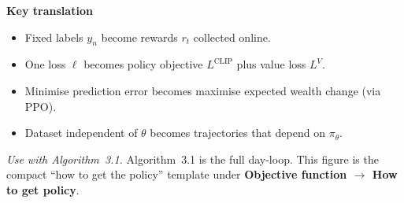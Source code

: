 \documentclass[10pt,a4paper]{article}
\begin{document}
\vspace{0.7em}
\noindent\textbf{Key translation}
\begin{itemize}\setlength\itemsep{0.12em}
  \item Fixed labels \(y_n\) become rewards \(r_t\) collected online.
  \item One loss \(\ell\) becomes policy objective \(L^{\mathrm{CLIP}}\) plus value loss \(L^{V}\).
  \item Minimise prediction error becomes maximise expected wealth change (via PPO).
  \item Dataset independent of \(\theta\) becomes trajectories that depend on \(\pi_\theta\).
\end{itemize}

\vspace{0.25em}
\noindent\footnotesize
\textit{Use with Algorithm~3.1.} Algorithm~3.1 is the full day-loop.
This figure is the compact ``how to get the policy'' template under
\textbf{Objective function $\rightarrow$ How to get policy}.
\end{document}
